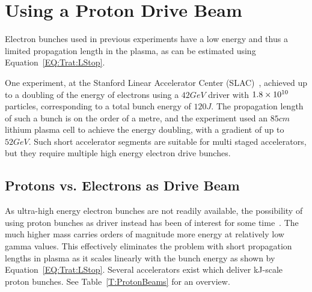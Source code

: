 \section{Using a Proton Drive Beam}
\label{Int:DBeam}

Electron bunches used in previous experiments have a low energy and thus a limited propagation length in the plasma, as can be estimated using Equation~\ref{EQ:Trat:LStop}.

One experiment, at the Stanford Linear Accelerator Center (SLAC)~\cite{blumenfeld:2007}, achieved up to a doubling of the energy of electrons using a $42\unit{GeV}$ driver with $1.8\times 10^{10}$ particles, corresponding to a total bunch energy of $120\unit{J}$.
The propagation length of such a bunch is on the order of a metre, and the experiment used an $85\unit{cm}$ lithium plasma cell to achieve the energy doubling, with a gradient of up to $52\unit{GeV}$.
Such short accelerator segments are suitable for multi staged accelerators, but they require multiple high energy electron drive bunches. 

\subsection{Protons vs. Electrons as Drive Beam}
\label{Int:DBeam:PDPWFA}

As ultra-high energy electron bunches are not readily available, the possibility of using proton bunches as driver instead has been of interest for some time~\cite{blue:2003,caldwell:2009}.
The much higher mass carries orders of magnitude more energy at relatively low gamma values.
This effectively eliminates the problem with short propagation lengths in plasma as it scales linearly with the bunch energy as shown by Equation~\ref{EQ:Trat:LStop}.
Several accelerators exist which deliver kJ-scale proton bunches.
See Table~\ref{T:ProtonBeams} for an overview.

